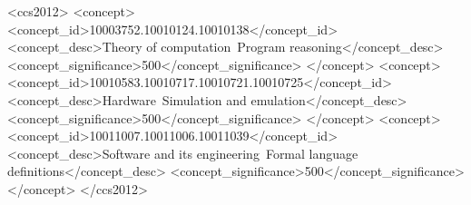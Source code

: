 \documentclass[sigplan,screen]{acmart}
\begin{document}
\author{Vikram S. Adve}

\author{Grigore Ro\c{s}u}

%
% 
%
%
%

%
\renewcommand{\shortauthors}{S. Dasgupta et al.}



%
%
\begin{CCSXML}
<ccs2012>
<concept>
<concept_id>10003752.10010124.10010138</concept_id>
<concept_desc>Theory of computation~Program reasoning</concept_desc>
<concept_significance>500</concept_significance>
</concept>
<concept>
<concept_id>10010583.10010717.10010721.10010725</concept_id>
<concept_desc>Hardware~Simulation and emulation</concept_desc>
<concept_significance>500</concept_significance>
</concept>
<concept>
<concept_id>10011007.10011006.10011039</concept_id>
<concept_desc>Software and its engineering~Formal language definitions</concept_desc>
<concept_significance>500</concept_significance>
</concept>
</ccs2012>
\end{CCSXML}
\end{document}
